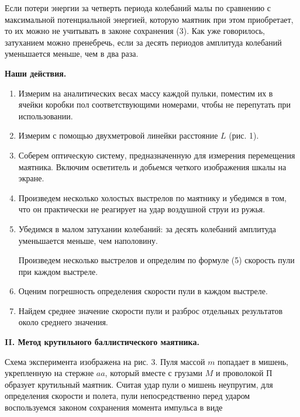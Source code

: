 \documentclass[14pt]{article}
\begin{document}
Если потери энергии за четверть периода колебаний малы по сравнению с максимальной потенциальной энергией, которую маятник при этом приобретает, то их можно не учитывать в законе сохранения (3). Как уже говорилось, затуханием можно пренебречь, если за десять периодов амплитуда колебаний уменьшается меньше, чем в два раза.

\vspace{1cm}
\textbf{Наши действия.}
\vspace{1cm}

\begin{flushleft}
\begin{enumerate}
\item  Измерим на аналитических весах массу каждой пульки, поместим их в ячейки коробки пол соответствующими номерами, чтобы не перепутать при использовании.

\item Измерим с помощью двухметровой линейки расстояние $L$ (рис. 1).

\item Соберем оптическую систему, предназначенную для измерения перемещения маятника. Включим осветитель и добьемся четкого изображения шкалы на экране.

\item Произведем несколько холостых выстрелов по маятнику и убедимся в том, что он практически не реагирует на удар воздушной струи из
ружья.

\item Убедимся в малом затухании колебаний: за десять колебаний амплитуда уменьшается меньше, чем наполовину.

Произведем несколько выстрелов и определим по формуле (5) скорость пули при каждом выстреле.

\item Оценим погрешность определения скорости пули в каждом выстреле.

\item Найдем среднее значение скорости пули и разброс отдельных результатов около среднего значения.
\end{enumerate}
\end{flushleft}

\vspace{1cm}
\textbf{II. Метод крутильного баллистического маятника.}

Схема эксперимента изображена на рис. 3. Пуля массой $m$ попадает в мишень, укрепленную на стержне $aa$, который вместе с грузами $M$ и проволокой $\text{П}$ образует крутильный маятник. Считая удар пули о мишень неупругим, для определения скорости и полета, пули непосредственно перед ударом воспользуемся законом сохранения момента импульса в виде
\end{document}
